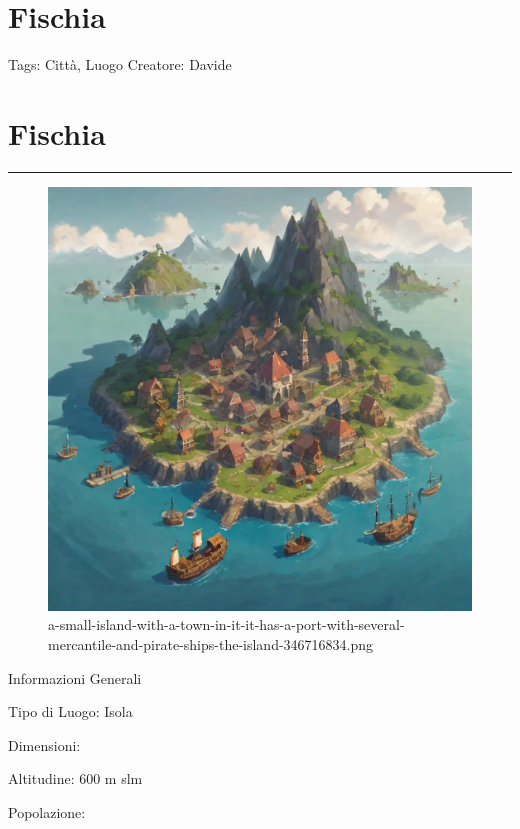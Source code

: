 \section{Fischia}\label{fischia}

Tags: Città, Luogo Creatore: Davide

\section{Fischia}\label{fischia-1}

\begin{center}\rule{0.5\linewidth}{0.5pt}\end{center}

\begin{figure}
\centering
\includegraphics{a-small-island-with-a-town-in-it-it-has-a-port-with-several-mercantile-and-pirate-ships-the-island-346716834.png}
\caption{a-small-island-with-a-town-in-it-it-has-a-port-with-several-mercantile-and-pirate-ships-the-island-346716834.png}
\end{figure}

Informazioni Generali

Tipo di Luogo: Isola

Dimensioni:

Altitudine: 600 m slm

Popolazione:

